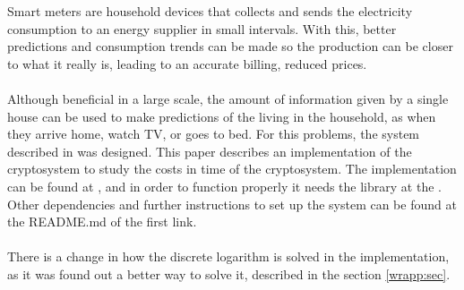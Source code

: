 
   Smart meters are household devices that collects and sends the electricity
   consumption to an energy supplier in small intervals. With this, better
   predictions and consumption trends can be made so the production can be closer to what it really is, leading to an accurate billing, reduced prices.\\
   \\
   Although beneficial in a large scale, the amount of information given by a single house can be used to make predictions of the living in the household, as when they arrive home, watch TV, or goes to bed. For this problems, the system described in \cite{recsi}
   was designed. This paper describes an implementation of the cryptosystem to study the costs in time of the cryptosystem. The implementation can be found at \cite{smart}%
   , and in order to function properly it needs the library at the \cite{ciglib}
   . Other dependencies and further instructions to set up the system can be found at the README.md of the first link.
   \\\\
   There is a change in how the discrete logarithm is solved in the implementation, as it was found out a better way to solve it, described in
   the section \ref{wrapp:sec}.
   
